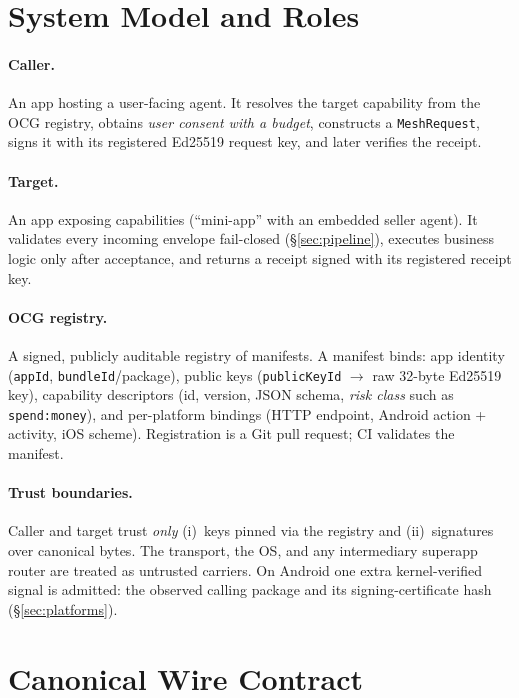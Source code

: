 \documentclass[10pt,twocolumn]{article}
\newcommand{\field}[1]{\texttt{#1}}
\begin{document}
\section{System Model and Roles}

\paragraph{Caller.} An app hosting a user-facing agent. It resolves the
target capability from the OCG registry, obtains \emph{user consent with a
budget}, constructs a \field{MeshRequest}, signs it with its registered
Ed25519 request key, and later verifies the receipt.

\paragraph{Target.} An app exposing capabilities (``mini-app'' with an
embedded seller agent). It validates every incoming envelope fail-closed
(\S\ref{sec:pipeline}), executes business logic only after acceptance, and
returns a receipt signed with its registered receipt key.

\paragraph{OCG registry.} A signed, publicly auditable registry of
manifests. A manifest binds: app identity (\field{appId},
\field{bundleId}/package), public keys (\field{publicKeyId}
$\rightarrow$ raw 32-byte Ed25519 key), capability descriptors (id,
version, JSON schema, \emph{risk class} such as \field{spend:money}), and
per-platform bindings (HTTP endpoint, Android action + activity, iOS
scheme). Registration is a Git pull request; CI validates the manifest.

\paragraph{Trust boundaries.} Caller and target trust \emph{only}
(i)~keys pinned via the registry and (ii)~signatures over canonical bytes.
The transport, the OS, and any intermediary superapp router are treated as
untrusted carriers. On Android one extra kernel-verified signal is
admitted: the observed calling package and its signing-certificate hash
(\S\ref{sec:platforms}).

\section{Canonical Wire Contract}
\label{sec:wire}
\end{document}
